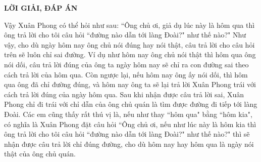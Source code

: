 \vspace*{10pt}
\centerline{\LARGE{\textbf{\color{gocco}LỜI GIẢI, ĐÁP ÁN}}}
\begin{multicols}{2}
	Vậy Xuân Phong có thể hỏi như sau: ``Ông chủ ơi, giả dụ lúc này là hôm qua thì ông  trả lời cho tôi câu hỏi  ``đường nào dẫn tới làng Đoài?" như thế nào?"
	\vskip 0.1cm
	Như vậy, cho dù ngày hôm nay ông chủ nói đúng hay nói thật, câu trả lời cho câu hỏi trên sẽ luôn chỉ  sai đường. 
	Ví dụ như hôm nay ông chủ nói thật thì hôm qua ông nói dối, câu trả lời đúng của ông ta ngày hôm nay sẽ chỉ ra con đường sai theo cách trả lời của hôm qua. Còn ngược lại, nếu hôm nay ông ấy nói dối, thì hôm qua ông đã chỉ đường đúng, và hôm nay ông ta sẽ lại trả lời Xuân Phong trái với cách trả lời đúng của ngày hôm qua.
	\vskip 0.1cm
	Sau khi nhận được câu trả lời sai, Xuân Phong chỉ đi trái với chỉ dẫn của ông chủ quán là tìm được đường đi tiếp tới làng Đoài.
	\vskip 0.1cm
	Các em cũng thấy rất thú vị là, nếu như thay ``hôm qua" bằng ``hôm kia", có nghĩa là Xuân Phong đặt câu hỏi ``Ông chủ ơi, nếu như lúc này là hôm kia thì ông  trả lời cho tôi câu hỏi  ``đường nào dẫn tới làng Đoài?" như thế nào?" thì sẽ nhận được câu trả lời chỉ đúng đường, cho dù hôm nay hay hôm qua là ngày nói thật của ông chủ quán.
\end{multicols}